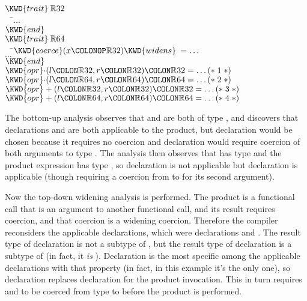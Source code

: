\begin{Fortress}
\(\KWD{trait}\:\mathbb{R}32\)\\
{\tt~~}\pushtabs\=\+\(  \ldots\)\-\\\poptabs
\(\KWD{end}\)\\[4pt]
\(\KWD{trait}\:\mathbb{R}64\)\\
{\tt~~}\pushtabs\=\+\(  \KWD{coerce}(x\COLONOP\mathbb{R}32) \KWD{widens}\: = \ldots\)\\
\(  \ldots\)\-\\\poptabs
\(\KWD{end}\)\\[4pt]
\(\KWD{opr} \mathord{\cdot}(l\COLON \mathbb{R}32, r\COLON \mathbb{R}32)\COLON \mathbb{R}32 = \ldots \mathtt{(*}\;\hbox{\rm  1 \unskip}\;\mathtt{*)}\)\\
\(\KWD{opr} \mathord{\cdot}(l\COLON \mathbb{R}64, r\COLON \mathbb{R}64)\COLON \mathbb{R}64 = \ldots \mathtt{(*}\;\hbox{\rm  2 \unskip}\;\mathtt{*)}\)\\
\(\KWD{opr} +(l\COLON \mathbb{R}32, r\COLON \mathbb{R}32)\COLON \mathbb{R}32 = \ldots \mathtt{(*}\;\hbox{\rm  3 \unskip}\;\mathtt{*)}\)\\
\(\KWD{opr} +(l\COLON \mathbb{R}64, r\COLON \mathbb{R}64)\COLON \mathbb{R}64 = \ldots \mathtt{(*}\;\hbox{\rm  4 \unskip}\;\mathtt{*)}\)
\end{Fortress}

The bottom-up analysis observes that  and  are both of type
, and discovers that declarations  and 
are both applicable to the product, but declaration 
would be chosen because it requires no coercion and declaration 
would require coercion of both arguments to type .
The analysis then observes that  has type 
and the product expression has type , so declaration
 is not applicable but declaration  is applicable
(though requiring a coercion from  to  for its second argument).

Now the top-down widening analysis is performed.  The product is
a functional call that is an argument to another functional call,
and its result requires coercion, and that coercion is a widening
coercion.  Therefore the compiler reconsiders the applicable
declarations, which were declarations  and .
The result type of declaration  is not a subtype
of , but the result type of declaration 
is a subtype of  (in fact, it \emph{is} ).
Declaration  is the most specific among the applicable declarations
with that property (in fact, in this example it's the only one),
so declaration  replaces declaration  for the
product invocation.  This in turn requires  and 
to be coerced from type  to 
before the product is performed.

